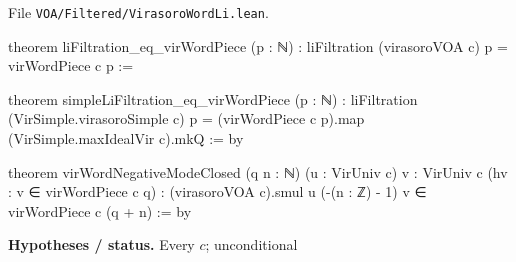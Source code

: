\documentclass[11pt,openany]{book}
\newcommand{\leanpath}[1]{\texttt{\small #1}}
\theoremstyle{definition}
\theoremstyle{plain}
\begin{document}
{\raggedright\noindent File \leanpath{VOA/\allowbreak Filtered/\allowbreak VirasoroWordLi.lean}.\par}
\begin{leancode}
theorem liFiltration_eq_virWordPiece (p : ℕ) :
    liFiltration (virasoroVOA c) p = virWordPiece c p :=

theorem simpleLiFiltration_eq_virWordPiece (p : ℕ) :
    liFiltration (VirSimple.virasoroSimple c) p =
      (virWordPiece c p).map (VirSimple.maxIdealVir c).mkQ := by

theorem virWordNegativeModeClosed (q n : ℕ) (u : VirUniv c) {v : VirUniv c}
    (hv : v ∈ virWordPiece c q) :
    (virasoroVOA c).smul u (-(n : ℤ) - 1) v ∈ virWordPiece c (q + n) := by
\end{leancode}
\noindent\textbf{Hypotheses / status.} Every $c$; unconditional\par
\medskip
\endgroup
\setcounter{chapter}{20}
\end{document}

